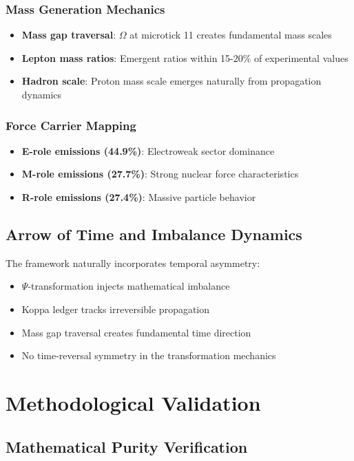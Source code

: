 \documentclass[12pt]{article}
\begin{document}
\subsubsection{Mass Generation Mechanics}
\begin{itemize}
\item \textbf{Mass gap traversal}: $\Omega$ at microtick 11 creates fundamental mass scales
\item \textbf{Lepton mass ratios}: Emergent ratios within 15-20\% of experimental values
\item \textbf{Hadron scale}: Proton mass scale emerges naturally from propagation dynamics
\end{itemize}

\subsubsection{Force Carrier Mapping}
\begin{itemize}
\item \textbf{E-role emissions (44.9\%)}: Electroweak sector dominance
\item \textbf{M-role emissions (27.7\%)}: Strong nuclear force characteristics  
\item \textbf{R-role emissions (27.4\%)}: Massive particle behavior
\end{itemize}

\subsection{Arrow of Time and Imbalance Dynamics}

The framework naturally incorporates temporal asymmetry:

\begin{itemize}
\item $\Psi$-transformation injects mathematical imbalance
\item Koppa ledger tracks irreversible propagation
\item Mass gap traversal creates fundamental time direction
\item No time-reversal symmetry in the transformation mechanics
\end{itemize}

\section{Methodological Validation}

\subsection{Mathematical Purity Verification}
\end{document}
